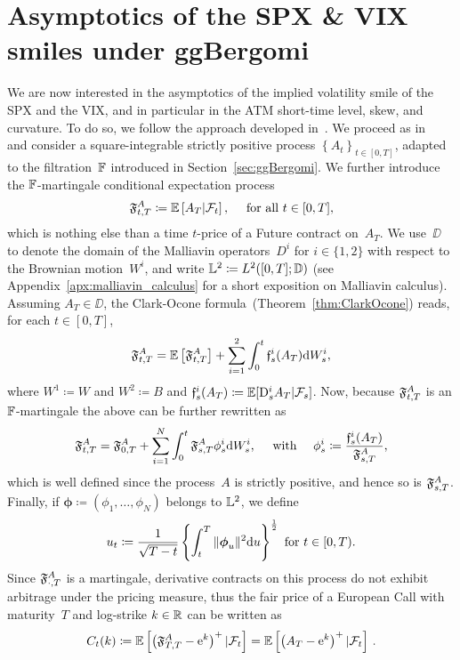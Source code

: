 \section{Asymptotics of the SPX \& VIX smiles under ggBergomi}

We are now interested in the asymptotics of the implied volatility smile of the SPX and the VIX,
and in particular in the ATM short-time level, skew, and curvature. 
To do so, we follow the approach developed in~\cite[Chapter~6-8]{Alos2021MalliavinFinance}.
We proceed as in~\cite{Jacquier2021RoughOptions} and consider a square-integrable strictly positive process $\left\{A_t\right\}_{t \in [0,T]}$, adapted to the filtration~$\mathbb{F}$ introduced in Section~\ref{sec:ggBergomi}. 
We further introduce the $\mathbb{F}$-martingale conditional expectation process
\[
\mathfrak{F}_{t,T}^A\coloneqq\mathbb{E}\left[A_T|\mathcal{F}_t\right], \quad \text { for all } t \in [0,T],
\]
which is nothing else than a time $t$-price of a Future contract on~$A_T$. 
We use~$\DD$ to denote the domain of the Malliavin operators~$D^i$ for $i\in\{1,2\}$ with respect to the Brownian motion~$W^i$, 
and write $\mathbb{L}^2 \coloneqq L^2([0, T]; \mathbb{D})$
(see Appendix~\ref{apx:malliavin_calculus} for a short exposition on Malliavin calculus). Assuming $A_T \in \DD$, the Clark-Ocone formula~(Theorem~\ref{thm:ClarkOcone}) %
reads, for each $t \in [0, T]$,
\[
\mathfrak{F}_{t,T}^A=\mathbb{E}\left[\mathfrak{F}_{t,T}^A\right] + \sum_{i=1}^2\int_0^t \mathfrak{f}_{s}^{i}(A_T) \mathrm{d} W_s^i,
\]
where $W^1\coloneqq W$ and $W^2\coloneqq B$ and $\mathfrak{f}_{s}^{i}(A_T)\coloneqq \mathbb{E}[\mathrm{D}^i_s A_T | \mathcal{F}_s]$. 
Now, because $\mathfrak{F}_{t,T}^A$ is an $\mathbb{F}$-martingale the above can be further rewritten as
\[
\mathfrak{F}_{t,T}^A = \mathfrak{F}_{0,T}^A + \sum_{i=1}^N\int_0^t \mathfrak{F}_{s,T}^A \phi_s^i \mathrm{d} W_s^i, \quad \textup{ with } \quad \phi_s^i \coloneqq \frac{\mathfrak{f}_{s}^{i}(A_T)}{\mathfrak{F}_{s,T}^A},
\]
which is well defined since the process~$A$ is strictly positive,
and hence so is ${\mathfrak{F}_{s,T}^A}$. Finally, if $\boldsymbol\phi\coloneqq (\phi_1, \dots, \phi_N)$ belongs to $\mathbb{L}^{2}$, we define
\begin{equation}
    u_t \coloneqq \frac{1}{\sqrt{T-t}} \left\{ \int_t^T \|\boldsymbol\phi_u\|^2 \mathrm{d} u\right\}^{\frac12}  \textup{ for } t\in[0,T).
\end{equation}
Since $\mathfrak{F}^A_{\cdot, T}$ is a martingale, derivative contracts on this process do not exhibit arbitrage under the pricing measure, thus the fair price of a European Call with maturity~$T$ and log-strike $k\in \mathbb{R}$ can be written as
\[
C_t(k) \coloneqq \mathbb{E}\left[\left(\mathfrak{F}_{T,T}^A - \mathrm{e}^k\right)^+|\mathcal{F}_t\right] = \mathbb{E}\left[\left(A_T - \mathrm{e}^k\right)^+|\mathcal{F}_t\right]\,.
\]

